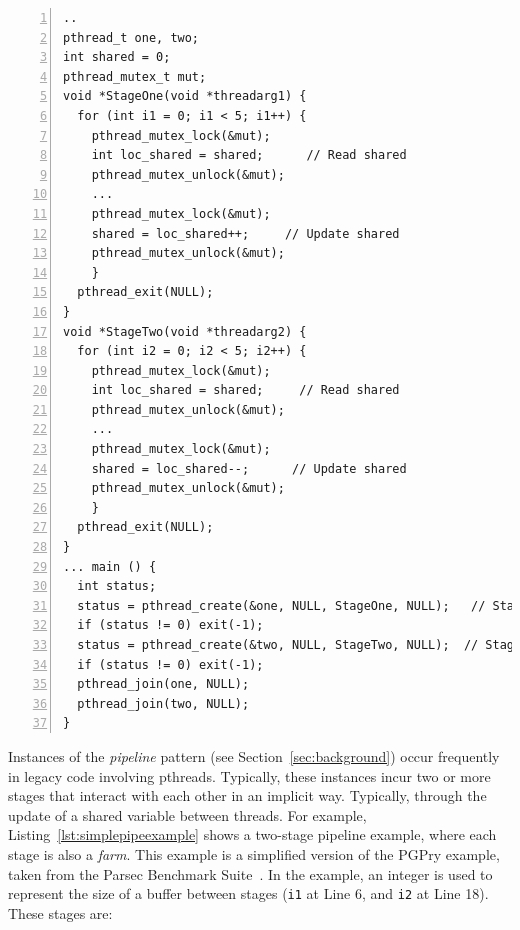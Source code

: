 \begin{lstlisting}[frame=single,numbers=left,label=lst:simplepipeexample,caption={Simple pipeline example, based on PGPry, from the Parsec benchmark suite.}]
..
pthread_t one, two;
int shared = 0;
pthread_mutex_t mut;
void *StageOne(void *threadarg1) {
  for (int i1 = 0; i1 < 5; i1++) {
    pthread_mutex_lock(&mut);
    int loc_shared = shared;      // Read shared
    pthread_mutex_unlock(&mut);
    ...
    pthread_mutex_lock(&mut);
    shared = loc_shared++;     // Update shared
    pthread_mutex_unlock(&mut);
    }
  pthread_exit(NULL);
}
void *StageTwo(void *threadarg2) {
  for (int i2 = 0; i2 < 5; i2++) { 
    pthread_mutex_lock(&mut);
    int loc_shared = shared;     // Read shared
    pthread_mutex_unlock(&mut);
    ...
    pthread_mutex_lock(&mut);
    shared = loc_shared--;      // Update shared
    pthread_mutex_unlock(&mut);
    }
  pthread_exit(NULL);
}
... main () {
  int status;
  status = pthread_create(&one, NULL, StageOne, NULL);   // Stage One
  if (status != 0) exit(-1);
  status = pthread_create(&two, NULL, StageTwo, NULL);  // Stage Two
  if (status != 0) exit(-1);
  pthread_join(one, NULL);
  pthread_join(two, NULL);
}
\end{lstlisting}



Instances of the \emph{pipeline} pattern (see Section~\ref{sec:background}) occur frequently in legacy code involving pthreads. Typically, these instances incur two or more stages that interact with each other in an implicit way. Typically, through the update of a shared variable between threads. For example, Listing~\ref{lst:simplepipeexample} shows a two-stage pipeline example, where each stage is also a \emph{farm}. This example is a simplified version of the PGPry example, taken from the Parsec Benchmark Suite~\cite{parsec}. In the example, an integer is used to represent the size of a buffer between stages (\lstinline|i1| at Line 6, and \lstinline|i2| at Line 18).
These stages are:

